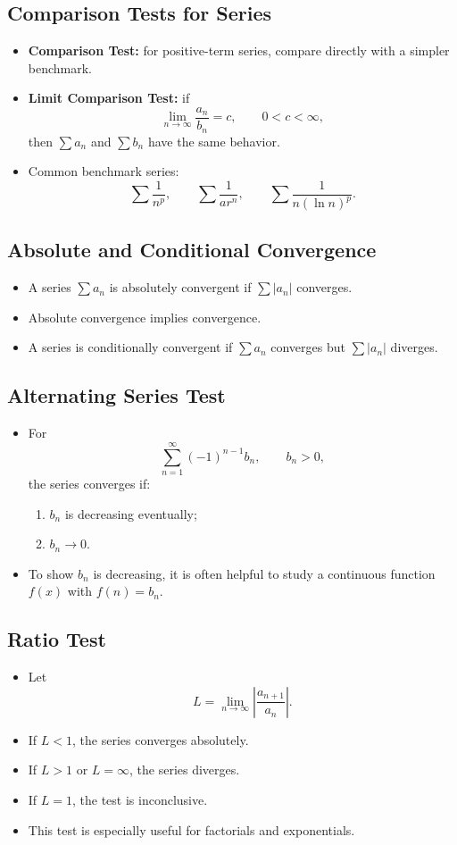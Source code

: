 \documentclass[11pt]{article}
\begin{document}
\subsection{Comparison Tests for Series}
\begin{itemize}
  \item \textbf{Comparison Test:} for positive-term series, compare directly with a simpler benchmark.
  \item \textbf{Limit Comparison Test:} if
  \[
  \lim_{n\to\infty}\frac{a_n}{b_n}=c,\qquad 0<c<\infty,
  \]
  then $\sum a_n$ and $\sum b_n$ have the same behavior.
  \item Common benchmark series:
  \[
  \sum \frac{1}{n^p},\qquad \sum \frac{1}{ar^n},\qquad \sum \frac{1}{n(\ln n)^p}.
  \]
\end{itemize}

\subsection{Absolute and Conditional Convergence}
\begin{itemize}
  \item A series $\sum a_n$ is absolutely convergent if $\sum |a_n|$ converges.
  \item Absolute convergence implies convergence.
  \item A series is conditionally convergent if $\sum a_n$ converges but $\sum |a_n|$ diverges.
\end{itemize}

\subsection{Alternating Series Test}
\begin{itemize}
  \item For
  \[
  \sum_{n=1}^\infty (-1)^{n-1}b_n,\qquad b_n>0,
  \]
  the series converges if:
  \begin{enumerate}
    \item $b_n$ is decreasing eventually;
    \item $b_n\to 0$.
  \end{enumerate}
  \item To show $b_n$ is decreasing, it is often helpful to study a continuous function $f(x)$ with $f(n)=b_n$.
\end{itemize}

\subsection{Ratio Test}
\begin{itemize}
  \item Let
  \[
  L=\lim_{n\to\infty}\left|\frac{a_{n+1}}{a_n}\right|.
  \]
  \item If $L<1$, the series converges absolutely.
  \item If $L>1$ or $L=\infty$, the series diverges.
  \item If $L=1$, the test is inconclusive.
  \item This test is especially useful for factorials and exponentials.
\end{itemize}
\end{document}
